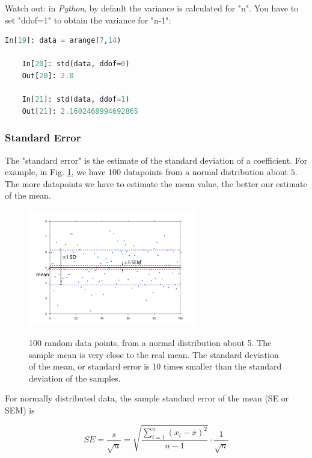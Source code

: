 Watch out: in \emph{Python}, by default the variance is calculated for "n". You have to set "ddof=1" to obtain the variance for "n-1":

\begin{lstlisting}[language=Python]
    In[19]: data = arange(7,14)

    In[20]: std(data, ddof=0)
    Out[20]: 2.0

    In[21]: std(data, ddof=1)
    Out[21]: 2.1602468994692865
\end{lstlisting}

\subsubsection{Standard Error} 

The "standard error" is the estimate of the standard deviation of a coefficient. For example, in Fig. \ref{fig:sem}, we have 100 datapoints from a normal distribution about $5$. The more datapoints we have to estimate the mean value, the better our estimate of the mean.

\begin{figure}[ht]
  \centering
  \includegraphics[width=0.66\textwidth]{../Images/standardError.jpg}\\
  \caption{100 random data points, from a normal distribution about 5. The sample mean is very close to the real mean. The standard deviation of the mean, or standard error is 10 times smaller than the standard deviation of the samples.}
  \label{fig:sem}
\end{figure}

For normally distributed data, the sample standard error of the mean (SE or SEM) is

\begin{equation}
  SE = \frac{s}{\sqrt{n}} = \sqrt{\frac{{\sum\limits_{i = 1}^n {({x_i-\bar{x}})^2} }}{n-1}} \cdot \frac{1}{\sqrt{n}}
\end{equation}

